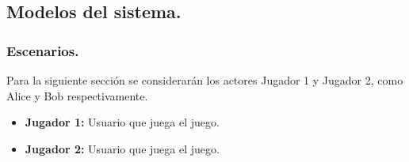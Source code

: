 \subsection{Modelos del sistema.}\label{cap:modelos-sistema}

\subsubsection{Escenarios.}\label{cap:escenarios}
Para la siguiente sección se considerarán los actores Jugador 1 y Jugador 2, como Alice y Bob respectivamente.
\begin{itemize}
    \item \textbf{Jugador 1:} Usuario que juega el juego.
    \item \textbf{Jugador 2:} Usuario que juega el juego.
\end{itemize}

